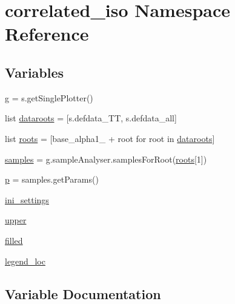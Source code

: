 \hypertarget{namespacecorrelated__iso}{}\section{correlated\+\_\+iso Namespace Reference}
\label{namespacecorrelated__iso}
\subsection*{Variables}
\begin{DoxyCompactItemize}
\item 
\mbox{\hyperlink{namespacecorrelated__iso_ae0afac7cfd4d5b56908657ab26d38c49}{g}} = s.\+get\+Single\+Plotter()
\item 
list \mbox{\hyperlink{namespacecorrelated__iso_aaa9108be0fe35b0f16c6f3c603f22c58}{dataroots}} = \mbox{[}s.\+defdata\+\_\+\+TT, s.\+defdata\+\_\+all\mbox{]}
\item 
list \mbox{\hyperlink{namespacecorrelated__iso_a085d55fb2097e66b8e0d80ca1e1da272}{roots}} = \mbox{[}\textquotesingle{}base\+\_\+alpha1\+\_\+\textquotesingle{} + root for root in \mbox{\hyperlink{namespacecorrelated__iso_aaa9108be0fe35b0f16c6f3c603f22c58}{dataroots}}\mbox{]}
\item 
\mbox{\hyperlink{namespacecorrelated__iso_ab1c43096ba8dd25890425ce47ea440d2}{samples}} = g.\+sample\+Analyser.\+samples\+For\+Root(\mbox{\hyperlink{namespacecorrelated__iso_a085d55fb2097e66b8e0d80ca1e1da272}{roots}}\mbox{[}1\mbox{]})
\item 
\mbox{\hyperlink{namespacecorrelated__iso_a86bbbd91a8d05c528a27c55171666716}{p}} = samples.\+get\+Params()
\item 
\mbox{\hyperlink{namespacecorrelated__iso_ad94ca1897bebbd90d40d5df15319dd69}{ini\+\_\+settings}}
\item 
\mbox{\hyperlink{namespacecorrelated__iso_a2e77214859088143ea01ab7589124fbe}{upper}}
\item 
\mbox{\hyperlink{namespacecorrelated__iso_a20126cc2f68741bdb0f5c81deba6ee84}{filled}}
\item 
\mbox{\hyperlink{namespacecorrelated__iso_a6f67e4db4c92c8d0ed8bcc246f4d1d9e}{legend\+\_\+loc}}
\end{DoxyCompactItemize}


\subsection{Variable Documentation}
\mbox{\label{namespacecorrelated__iso_aaa9108be0fe35b0f16c6f3c603f22c58}} 

